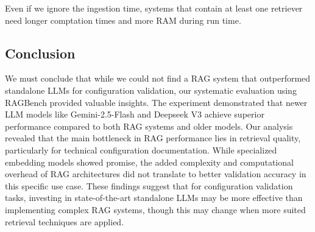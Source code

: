 Even if we ignore the ingestion time, systems that contain at least one retriever need longer comptation times and more RAM during run time. 

\subsection{Conclusion} \label{sec:exp_conclusion}

We must conclude that while we could not find a RAG system that outperformed standalone LLMs for configuration validation, our systematic evaluation using RAGBench provided valuable insights. The experiment demonstrated that newer LLM models like Gemini-2.5-Flash and Deepseek V3 achieve superior performance compared to both RAG systems and older models. Our analysis revealed that the main bottleneck in RAG performance lies in retrieval quality, particularly for technical configuration documentation. While specialized embedding models showed promise, the added complexity and computational overhead of RAG architectures did not translate to better validation accuracy in this specific use case. These findings suggest that for configuration validation tasks, investing in state-of-the-art standalone LLMs may be more effective than implementing complex RAG systems, though this may change when more suited retrieval techniques are applied.